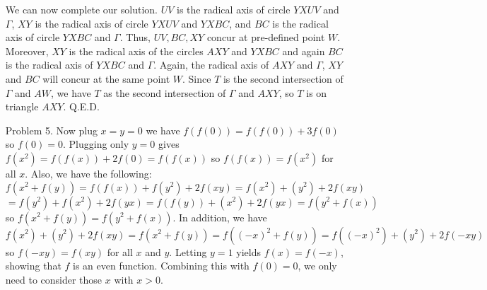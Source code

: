 \documentclass[11pt,a4paper]{article}
\begin{document}
\begin{enumerate}
	We can now complete our solution. $UV$ is the radical axis of circle $YXUV$ and $\Gamma$, $XY$ is the radical axis of circle $YXUV$ and $YXBC$, and $BC$ is the radical axis of circle $YXBC$ and $\Gamma$. Thus, $UV, BC, XY$ concur at pre-defined point $W$. Moreover, $XY$ is the radical axis of the circles $AXY$ and $YXBC$ and again $BC$ is the radical axis of $YXBC$ and $\Gamma$. Again, the radical axis of $AXY$ and $\Gamma$, $XY$ and $BC$ will concur at the same point $W$. Since $T$ is the second intersection of $\Gamma$ and $AW$, we have $T$ as the second intersection of $\Gamma$ and $AXY$, so $T$ is on triangle $AXY$. Q.E.D. 
	
	\item[Problem 5.]
	Now plug $x=y=0$ we have $f(f(0))=f(f(0))+3f(0)$ so $f(0)=0$. Plugging only $y=0$ gives $f(x^2)=f(f(x))+2f(0)=f(f(x))$ so $f(f(x))=f(x^2)$ for all $x$. 
	Also, we have the following:
	\[f(x^2+f(y))=f(f(x))+f(y^2)+2f(xy)=f(x^2)+(y^2)+2f(xy)\]
	\[=f(y^2)+f(x^2)+2f(yx)=f(f(y))+(x^2)+2f(yx)=f(y^2+f(x))
	\]
	so $f(x^2+f(y))=f(y^2+f(x))$. 
	In addition, we have $f(x^2)+(y^2)+2f(xy)=f(x^2+f(y))=f((-x)^2+f(y))=f((-x)^2)+(y^2)+2f(-xy)$ so $f(-xy)=f(xy)$ for all $x$ and $y$. Letting $y=1$ yields $f(x)=f(-x)$, showing that $f$ is an even function. Combining this with $f(0)=0$, we only need to consider those $x$ with $x>0$. 
	

\end{enumerate}
\end{document}
